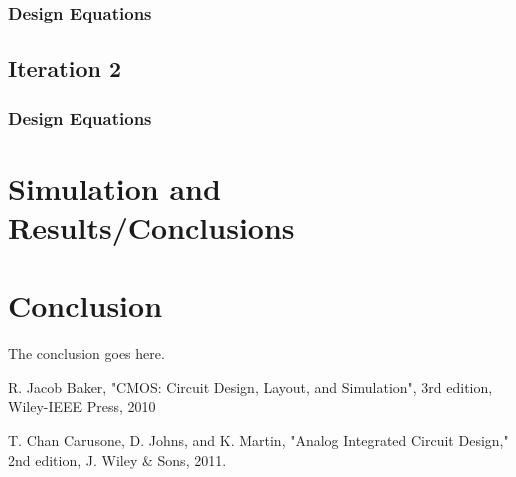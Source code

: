 \documentclass[conference]{IEEEtran}
\begin{document}
\subsubsection{Design Equations}

\subsection{Iteration 2}
\subsubsection{Design Equations}

\section{Simulation and Results/Conclusions}

\section{Conclusion}
The conclusion goes here.



%
%
%
\begin{thebibliography}{1}
R. Jacob Baker, "CMOS: Circuit Design, Layout, and Simulation", 3rd edition, Wiley-IEEE Press, 2010

T. Chan Carusone, D. Johns, and K. Martin, "Analog Integrated Circuit Design," 2nd edition, J. Wiley \& Sons, 2011.
\end{thebibliography}
\end{document}
